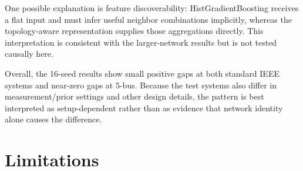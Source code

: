\documentclass[conference]{IEEEtran}
\begin{document}
One possible explanation is feature discoverability: HistGradientBoosting receives a flat input and must infer useful neighbor combinations implicitly, whereas the topology-aware representation supplies those aggregations directly. This interpretation is consistent with the larger-network results but is not tested causally here.

Overall, the 16-seed results show small positive gaps at both standard IEEE systems and near-zero gaps at 5-bus. Because the test systems also differ in measurement/prior settings and other design details, the pattern is best interpreted as setup-dependent rather than as evidence that network identity alone causes the difference.

\section{Limitations}
\end{document}

